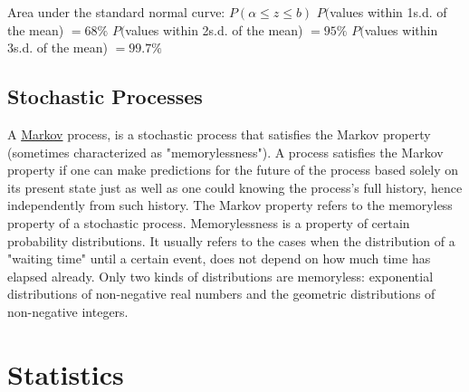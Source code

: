 \documentclass[12pt]{article}
\begin{document}
\begin{flushleft}
	Area under the standard normal curve: $P(\alpha \leq z \leq b) $ \linebreak 
	$P($values within 1s.d. of the mean) $ = 68\%$ \linebreak 
	$P($values within 2s.d. of the mean) $ = 95\%$ \linebreak 
	$P($values within 3s.d. of the mean) $ =99.7\%$ \linebreak 
	
	\subsection{Stochastic Processes}
	
	\textbullet \quad A \uline{Markov} process, is a stochastic process that satisfies the Markov property (sometimes characterized as "memorylessness"). A process satisfies the Markov property if one can make predictions for the future of the process based solely on its present state just as well as one could knowing the process's full history, hence independently from such history. \linebreak 
	\textbullet \quad The Markov property refers to the memoryless property of a stochastic process.  \linebreak 
	\textbullet \quad Memorylessness is a property of certain probability distributions. It usually refers to the cases when the distribution of a "waiting time" until a certain event, does not depend on how much time has elapsed already. Only two kinds of distributions are memoryless: exponential distributions of non-negative real numbers and the geometric distributions of non-negative integers. \linebreak 
	
	
	\pagebreak
	
	
	\section{Statistics}
	

\end{flushleft}
\end{document}
